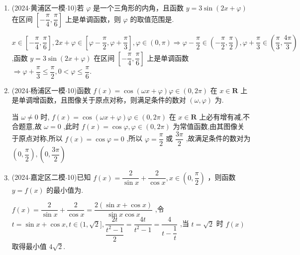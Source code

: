 \begin{enumerate}
    \item (2024$\cdot$黄浦区一模$\cdot$10)若 $\varphi$ 是一个三角形的内角，且函数 $y = 3\sin \left( {{2x} + \varphi }\right)$ 在区间 $\left\lbrack  {-\dfrac{\pi }{4},\dfrac{\pi }{6}}\right\rbrack$ 上是单调函数，则 $\varphi$ 的取值范围是.
    \begin{jieda}
        $x \in  \left\lbrack  {-\dfrac{\pi }{4},\dfrac{\pi }{6}}\right\rbrack  ,{2x} + \varphi  \in  \left\lbrack  {\varphi  - \dfrac{\pi }{2},\varphi  + \dfrac{\pi }{3}}\right\rbrack  ,\varphi  \in  \left( {0,\pi }\right)  \Longrightarrow  \varphi  - \dfrac{\pi }{2} \in  \left( {-\dfrac{\pi }{2},\dfrac{\pi }{2}}\right) ,\varphi  + \dfrac{\pi }{3} \in  \left( {\dfrac{\pi }{3},\dfrac{4\pi }{3}}\right)$ ,函数 $y =  3\sin \left( {{2x} + \varphi }\right)$ 在区间 $\left\lbrack  {-\dfrac{\pi }{4},\dfrac{\pi }{6}}\right\rbrack$ 上是单调函数 $\Longrightarrow  \varphi  + \dfrac{\pi }{3} \leq  \dfrac{\pi }{2},0 < \varphi  \leq  \dfrac{\pi }{6}.$
    \end{jieda}

    \item (2024$\cdot$杨浦区一模$\cdot$10)函数 $f\left( x\right)  = \cos \left( {{\omega x} + \varphi }\right) \varphi  \in  \left( {0,{2\pi }}\right)$ 在 $x \in  \mathbf{R}$ 上是单调增函数，且图像关于原点对称，则满足条件的数对 $\left( {\omega ,\varphi }\right)$ 为.
    \begin{jieda}
        当 $\omega  \neq  0$ 时, $f\left( x\right)  = \cos \left( {{\omega x} + \varphi }\right) \varphi  \in  \left( {0,{2\pi }}\right)$ 在 $x \in  \mathbf{R}$ 上必有增有减,不合题意,故 $\omega  = 0$ ,此时 $f\left( x\right)  = \cos \varphi ,\varphi  \in  \left( {0,{2\pi }}\right)$ 为常值函数,由其图像关于原点对称,所以 $f\left( x\right)  =  \cos \varphi  = 0$ ,所以 $\varphi  = \dfrac{\pi }{2}$ 或 $\dfrac{3\pi }{2}$ ,故满足条件的数对为 $\left( {0,\dfrac{\pi }{2}}\right) ,\left(0, \dfrac{3\pi }{2}\right)$
    \end{jieda}

    \item (2024$\cdot$嘉定区二模$\cdot$10)已知 $f\left( x\right)  = \dfrac{2}{\sin x} + \dfrac{2}{\cos x},x \in  \left( {0,\dfrac{\pi }{2}}\right)$ ，则函数 $y = f\left( x\right)$ 的最小值为.
    \begin{jieda}
        $f\left( x\right)  = \dfrac{2}{\sin x} + \dfrac{2}{\cos x} = \dfrac{2\left( {\sin x + \cos x}\right) }{\sin x\cos x}$ ,令 $t = \sin x +  \cos x,t \in  (1,\sqrt{2}\rbrack ,\dfrac{2t}{\dfrac{{t}^{2} - 1}{2}} = \dfrac{4t}{{t}^{2} - 1} = \dfrac{4}{t - \dfrac{1}{t}}$ ,当 $t = \sqrt{2}$ 时 $f\left( x\right)$ 取得最小值 $4\sqrt{2}$.
    \end{jieda}


\end{enumerate}
